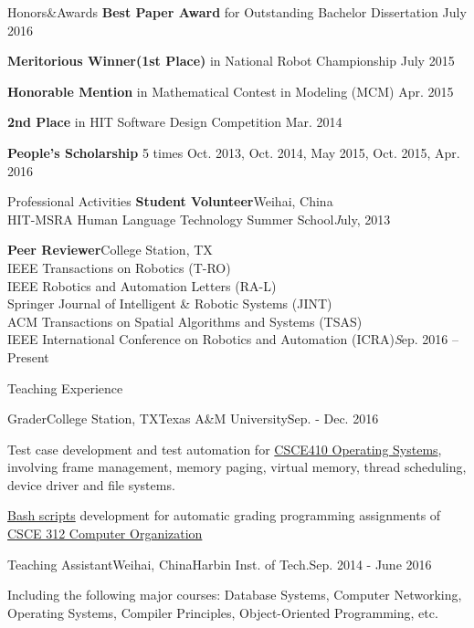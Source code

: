 \documentclass{resume} %
\begin{document}
\begin{rSection}{Honors\&Awards}
{\bf Best Paper Award}{ for Outstanding Bachelor Dissertation} \hfill {July 2016}
\vspace*{-0.4em}

{\bf Meritorious Winner(1st Place)}{ in National Robot Championship} \hfill {July 2015}
\vspace*{-0.4em}

{\bf Honorable Mention}{ in Mathematical Contest in Modeling (MCM)} \hfill {Apr. 2015}
\vspace*{-0.4em}

{\bf 2nd Place}{ in HIT Software Design Competition} \hfill {Mar. 2014} 
\vspace*{-0.4em}

{\bf People's Scholarship} 5 times \hfill {Oct. 2013, Oct. 2014, May 2015, Oct. 2015, Apr. 2016}
\vspace*{-0.4em}

\end{rSection}

\begin{rSection}{Professional Activities}
{\bf Student Volunteer}\hfill Weihai, China\\
HIT-MSRA Human Language Technology Summer School\hfill {\emph July, 2013}
\vspace*{-0.2em}

{\bf Peer Reviewer}\hfill College Station, TX\\
IEEE Transactions on Robotics (T-RO)\\
IEEE Robotics and Automation Letters (RA-L)\\
Springer Journal of Intelligent \& Robotic Systems (JINT)\\
ACM Transactions on Spatial Algorithms and Systems (TSAS)\\
IEEE International Conference on Robotics and Automation (ICRA)\hfill {\emph Sep. 2016 -- Present}
\end{rSection}

\begin{rSection}{Teaching Experience}
\begin{rSubsection}{Grader}{College Station, TX}{Texas A\&M University}{Sep. - Dec. 2016}
\item Test case development and test automation for \href{http://faculty.cse.tamu.edu/dilma/web-csce410-fall16/index.htm}{CSCE410 Operating Systems}, involving frame management, memory paging, virtual memory, thread scheduling, device driver and file systems.
\item \href{https://github.com/tamu-csce312/hw-test}{Bash scripts} development for automatic grading programming assignments of \href{http://faculty.cse.tamu.edu/djimenez/312/}{CSCE 312 Computer Organization}
\end{rSubsection}

\begin{rSubsection}{Teaching Assistant}{Weihai, China}{Harbin Inst. of Tech.}{Sep. 2014 - June 2016}
\item Including the following major courses: Database Systems, Computer Networking, Operating Systems, Compiler Principles, Object-Oriented Programming, etc.
\end{rSubsection}
\end{rSection}
\end{document}
